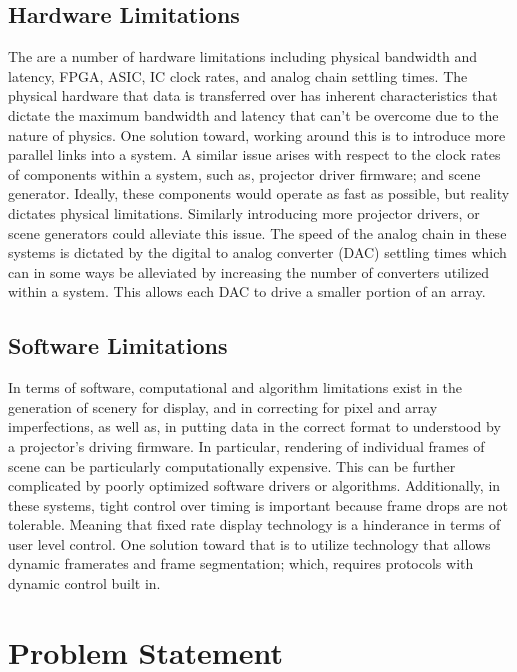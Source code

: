 \subsection{Hardware Limitations}
    The are a number of hardware limitations including physical bandwidth and latency, FPGA, ASIC, IC clock rates, and analog chain settling times. The physical hardware that data is transferred over has inherent characteristics that dictate the maximum bandwidth and latency that can't be overcome due to the nature of physics. One solution toward, working around this is to introduce more parallel links into a system. A similar issue arises with respect to the clock rates of components within a system, such as, projector driver firmware; and scene generator. Ideally, these components would operate as fast as possible, but reality dictates physical limitations. Similarly introducing more projector drivers, or scene generators could alleviate this issue. The speed of the analog chain in these systems is dictated by the digital to analog converter (DAC) settling times which can in some ways be alleviated by increasing the number of converters utilized within a system. This allows each DAC to drive a smaller portion of an array.

\subsection{Software Limitations}
    In terms of software, computational and algorithm limitations exist in the generation of scenery for display, and in correcting for pixel and array imperfections, as well as, in putting data in the correct format to understood by a projector's driving firmware. In particular, rendering of individual frames of scene can be particularly computationally expensive. This can be further complicated by poorly optimized software drivers or algorithms. Additionally, in these systems, tight control over timing is important because frame drops are not tolerable. Meaning that fixed rate display technology is a hinderance in terms of user level control. One solution toward that is to utilize technology that allows dynamic framerates and frame segmentation; which, requires protocols with dynamic control built in.


\section{Problem Statement}

